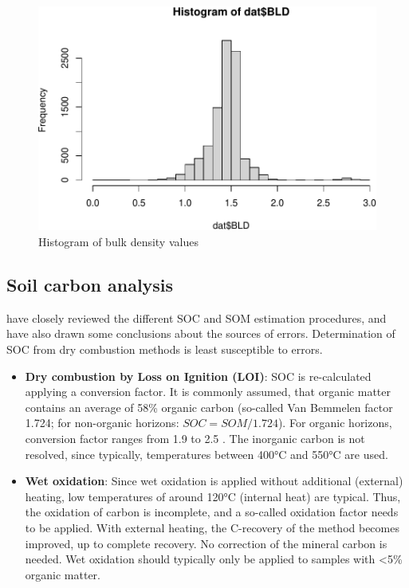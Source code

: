 \documentclass[10pt,b5paper,]{book}
\theoremstyle{definition}
\theoremstyle{definition}
\theoremstyle{definition}
\theoremstyle{remark}
\begin{document}
\begin{figure}
\centering
\includegraphics{SOCMapping_files/figure-latex/unnamed-chunk-12-1.pdf}
\caption{\label{fig:unnamed-chunk-12}Histogram of bulk density values}
\end{figure}

\hypertarget{soil-carbon-analysis}{%
\subsection{Soil carbon analysis}\label{soil-carbon-analysis}}

\cite{rosell2001soil} have closely reviewed the different SOC and SOM
estimation procedures, and have also drawn some conclusions about the
sources of errors. Determination of SOC from dry combustion methods is
least susceptible to errors.

\begin{itemize}
\item
  \textbf{Dry combustion by Loss on Ignition (LOI)}: SOC is
  re-calculated applying a conversion factor. It is commonly assumed,
  that organic matter contains an average of 58\% organic carbon
  (so-called Van Bemmelen factor 1.724; for non-organic horizons:
  \(SOC = SOM / 1.724\)). For organic horizons, conversion factor ranges
  from 1.9 to 2.5 \citep{nelson1982total}. The inorganic carbon is not
  resolved, since typically, temperatures between 400°C and 550°C are
  used.
\item
  \textbf{Wet oxidation}: Since wet oxidation is applied without
  additional (external) heating, low temperatures of around 120°C
  (internal heat) are typical. Thus, the oxidation of carbon is
  incomplete, and a so-called oxidation factor needs to be applied. With
  external heating, the C-recovery of the method becomes improved, up to
  complete recovery. No correction of the mineral carbon is needed. Wet
  oxidation should typically only be applied to samples with
  \textless{}5\% organic matter.
\end{itemize}
\end{document}
